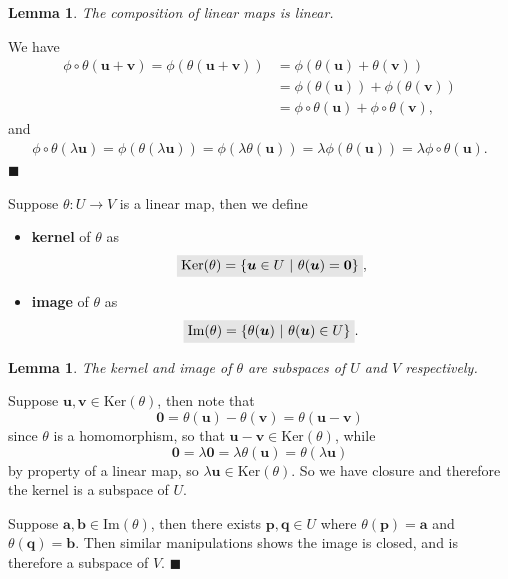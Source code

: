 \documentclass[letter-paper]{tufte-book}
\newtheorem{lemma}[theorem]{\color{pastel-blue}Lemma}
\newenvironment{proof}[1][Proof]{\begin{trivlist}
\item[\hskip \labelsep {\bfseries #1}]}{\end{trivlist}}
\newcommand{\Ob}{{\boldsymbol{0}}}
\newcommand{\ub}{{\boldsymbol{u}}}
\newcommand{\vb}{{\boldsymbol{v}}}
\newcommand{\qed}{\hfill$\blacksquare$}
\newcommand{\highlight}[1]{\mathchoice%
  {\colorbox{black!10}{$\displaystyle#1$}}%
  {\colorbox{black!10}{$\textstyle#1$}}%
  {\colorbox{black!10}{$\scriptstyle#1$}}%
  {\colorbox{black!10}{$\scriptscriptstyle#1$}}}%
\begin{document}
\begin{lemma}
  \item The composition of linear maps is linear.
\end{lemma}

\begin{proof}
  We have
  \begin{align*}
    \phi \circ \theta(\ub + \vb) = \phi(\theta(\ub + \vb)) &= \phi(\theta(\ub) + \theta(\vb)) \\
      & = \phi(\theta(\ub)) + \phi(\theta(\vb)) \\
      & = \phi \circ \theta(\ub) + \phi \circ \theta(\vb),
  \end{align*}
  and
  \begin{align*}
    \phi \circ \theta(\lambda\ub) = \phi(\theta(\lambda\ub)) = \phi(\lambda\theta(\ub)) = \lambda\phi(\theta(\ub)) = \lambda \phi \circ \theta(\ub).
  \end{align*}
  \qed
\end{proof}

Suppose $\theta : U \to V$ is a linear map, then we define
\begin{itemize}
  \item \textbf{kernel} of $\theta$ as
  \begin{equation}
    \highlight{\mbox{Ker}(\theta) = \{\ub \in U\ |\ \theta(\ub) = \Ob\}},
  \end{equation}
  \item \textbf{image} of $\theta$ as
  \begin{equation}
    \highlight{\mbox{Im}(\theta) = \{\theta(\ub) \ |\ \theta(\ub) \in U\}}.
  \end{equation}
\end{itemize}

\begin{lemma}
  The kernel and image of $\theta$ are subspaces of $U$ and $V$ respectively.
\end{lemma}

\begin{proof}
  Suppose $\ub, \vb \in \mbox{Ker}(\theta)$, then note that
  \begin{equation*}
    \Ob = \theta(\ub) - \theta(\vb) = \theta(\ub - \vb)
  \end{equation*}
  since $\theta$ is a homomorphism, so that $\ub - \vb \in \mbox{Ker}(\theta)$, while
  \begin{equation*}
    \Ob = \lambda \Ob = \lambda \theta(\ub) = \theta(\lambda\ub)
  \end{equation*}
  by property of a linear map, so $\lambda\ub \in \mbox{Ker}(\theta)$. So we have closure and therefore the kernel is a subspace of $U$.
  
  Suppose $\boldsymbol{a}, \boldsymbol{b} \in \mbox{Im}(\theta)$, then there exists $\boldsymbol{p}, \boldsymbol{q} \in U$ where $\theta(\boldsymbol{p}) = \boldsymbol{a}$ and $\theta(\boldsymbol{q}) = \boldsymbol{b}$. Then similar manipulations shows the image is closed, and is therefore a subspace of $V$. \qed
\end{proof}
\end{document}
